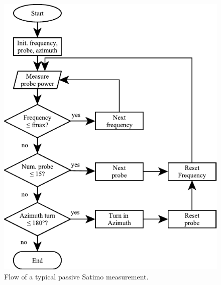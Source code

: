 \begin{figure}[htbp]
    \centering
    \includegraphics{img/analysis/satimoflow}
    \caption{Flow of a typical passive Satimo measurement.}
    \label{fig:satimoflow}
\end{figure}



